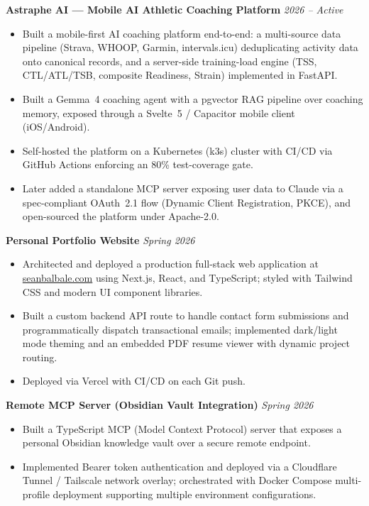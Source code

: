 \documentclass[10pt, letterpaper]{article}
\newcommand{\cvproject}[2]{\textbf{#1} \hfill \textit{#2}\vspace{1pt}}
\begin{document}
\vspace{4pt}

\cvproject{Astraphe AI --- Mobile AI Athletic Coaching Platform}{2026 -- Active}
\begin{itemize}
  \item Built a mobile-first AI coaching platform end-to-end: a multi-source data pipeline
        (Strava, WHOOP, Garmin, intervals.icu) deduplicating activity data onto canonical
        records, and a server-side training-load engine (TSS, CTL/ATL/TSB, composite Readiness,
        Strain) implemented in FastAPI.
  \item Built a Gemma~4 coaching agent with a pgvector RAG pipeline over coaching memory,
        exposed through a Svelte~5 / Capacitor mobile client (iOS/Android).
  \item Self-hosted the platform on a Kubernetes (k3s) cluster with CI/CD via GitHub Actions
        enforcing an 80\% test-coverage gate.
  \item Later added a standalone MCP server exposing user data to Claude via a spec-compliant
        OAuth~2.1 flow (Dynamic Client Registration, PKCE), and open-sourced the platform under
        Apache-2.0.
\end{itemize}

\vspace{4pt}

\cvproject{Personal Portfolio Website}{Spring 2026}
\begin{itemize}
  \item Architected and deployed a production full-stack web application at
        \href{https://www.seanbalbale.com}{seanbalbale.com}
        using Next.js, React, and TypeScript; styled with Tailwind CSS and modern UI component
        libraries.
  \item Built a custom backend API route to handle contact form submissions and programmatically
        dispatch transactional emails; implemented dark/light mode theming and an embedded PDF
        resume viewer with dynamic project routing.
  \item Deployed via Vercel with CI/CD on each Git push.
\end{itemize}

\vspace{4pt}

\cvproject{Remote MCP Server (Obsidian Vault Integration)}{Spring 2026}
\begin{itemize}
  \item Built a TypeScript MCP (Model Context Protocol) server that exposes a personal Obsidian
        knowledge vault over a secure remote endpoint.
  \item Implemented Bearer token authentication and deployed via a Cloudflare Tunnel / Tailscale
        network overlay; orchestrated with Docker Compose multi-profile deployment supporting
        multiple environment configurations.
\end{itemize}
\end{document}
